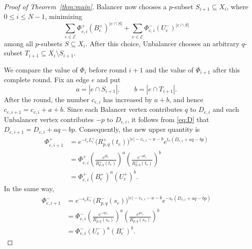 \documentclass[twoside,12pt]{article}
\numberwithin{equation}{section}
\begin{document}
\begin{proof}[Proof of Theorem~\ref{thm:main}]
Balancer now chooses a $p$-subset $S_{i+1}\subseteq X_i$, where $0\le i\le N-1$, minimizing
\begin{equation}
\label{eq:strategy-objective-indexed}
        \sum_{e\in\mathcal E}
        \Phi_{e,i}^+(B_e^+)^{|e\cap S|}
        +
        \sum_{e\in\mathcal E}
        \Phi_{e,i}^-(U_e^-)^{|e\cap S|}
\end{equation}
among all $p$-subsets $S\subseteq X_i$. After this choice, Unbalancer chooses an arbitrary $q$-subset $T_{i+1}\subseteq X_i\setminus S_{i+1}$.

We compare the value of $\Phi_i$ before round $i+1$ and the value of $\Phi_{i+1}$ after this complete round. Fix an edge $e$ and put
\[
        a=|e\cap S_{i+1}|,
        \qquad
        b=|e\cap T_{i+1}|.
\]
After the round, the number $c_{e,i}$ has increased by $a+b$, and hence
$c_{e,i+1}=c_{e,i}+a+b$.
Since each Balancer vertex contributes $q$ to $D_{e,i}$ and each Unbalancer vertex contributes $-p$ to $D_{e,i}$, it follows from \eqref{eq:D} that
$D_{e,i+1}=D_{e,i}+aq-bp$.
Consequently, the new upper quantity is
\begin{equation}\label{equ-2-5-indexed}
\begin{aligned}
        \Phi_{e,i+1}^+
        &=
        e^{-t_eL_e^+}
        \bigl(R^+_{p,q}(t_e)\bigr)^{|e|-c_{e,i}-a-b}
        e^{t_e(D_{e,i}+aq-bp)}  \\[0.2cm]
        &=
        \Phi_{e,i}^+
        \left(\frac{e^{qt_e}}{R^+_{p,q}(t_e)}\right)^a
        \left(\frac{e^{-pt_e}}{R^+_{p,q}(t_e)}\right)^b  \\[0.2cm]
        &=
        \Phi_{e,i}^+(B_e^+)^a(U_e^+)^b.
\end{aligned}
\end{equation}
In the same way,
\begin{equation}\label{equ-2-6-indexed}
\begin{aligned}
        \Phi_{e,i+1}^-
        &=
        e^{-s_eL_e^-}
        \bigl(R^-_{p,q}(s_e)\bigr)^{|e|-c_{e,i}-a-b}
        e^{-s_e(D_{e,i}+aq-bp)} \\[0.2cm]
        &=
        \Phi_{e,i}^-
        \left(\frac{e^{-qs_e}}{R^-_{p,q}(s_e)}\right)^a
        \left(\frac{e^{ps_e}}{R^-_{p,q}(s_e)}\right)^b  \\[0.2cm]
        &=
        \Phi_{e,i}^-(U_e^-)^a(B_e^-)^b.
\end{aligned}
\end{equation}


\end{proof}
\end{document}
